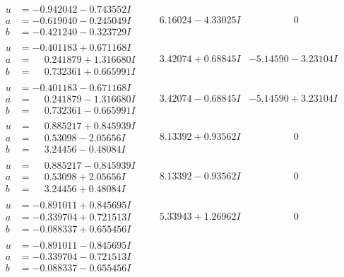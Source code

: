 \documentclass[1p]{elsarticle_modified}
\theoremstyle{definition}
\begin{document}
$$\begin{array}{c|c|c}
\begin{aligned}
u &= -0.942042 - 0.743552 I \\
a &= -0.619040 - 0.245049 I \\
b &= -0.421240 - 0.323729 I\end{aligned}
 & \phantom{-}6.16024 - 4.33025 I & \phantom{-0.000000 } 0 \\ \hline\begin{aligned}
u &= -0.401183 + 0.671168 I \\
a &= \phantom{-}0.241879 + 1.316680 I \\
b &= \phantom{-}0.732361 + 0.665991 I\end{aligned}
 & \phantom{-}3.42074 + 0.68845 I & -5.14590 - 3.23104 I \\ \hline\begin{aligned}
u &= -0.401183 - 0.671168 I \\
a &= \phantom{-}0.241879 - 1.316680 I \\
b &= \phantom{-}0.732361 - 0.665991 I\end{aligned}
 & \phantom{-}3.42074 - 0.68845 I & -5.14590 + 3.23104 I \\ \hline\begin{aligned}
u &= \phantom{-}0.885217 + 0.845939 I \\
a &= \phantom{-}0.53098 - 2.05656 I \\
b &= \phantom{-}3.24456 - 0.48084 I\end{aligned}
 & \phantom{-}8.13392 + 0.93562 I & \phantom{-0.000000 } 0 \\ \hline\begin{aligned}
u &= \phantom{-}0.885217 - 0.845939 I \\
a &= \phantom{-}0.53098 + 2.05656 I \\
b &= \phantom{-}3.24456 + 0.48084 I\end{aligned}
 & \phantom{-}8.13392 - 0.93562 I & \phantom{-0.000000 } 0 \\ \hline\begin{aligned}
u &= -0.891011 + 0.845695 I \\
a &= -0.339704 + 0.721513 I \\
b &= -0.088337 + 0.655456 I\end{aligned}
 & \phantom{-}5.33943 + 1.26962 I & \phantom{-0.000000 } 0 \\ \hline\begin{aligned}
u &= -0.891011 - 0.845695 I \\
a &= -0.339704 - 0.721513 I \\
b &= -0.088337 - 0.655456 I\end{aligned}

\end{array}$$
\end{document}
